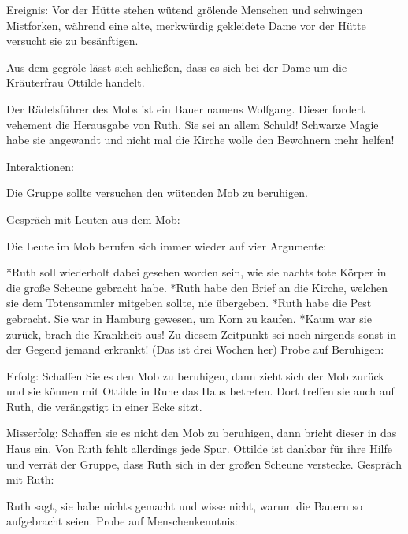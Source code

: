 Ereignis: Vor der Hütte stehen wütend grölende Menschen und schwingen Mistforken, während eine alte, merkwürdig gekleidete Dame vor der Hütte versucht sie zu besänftigen.

Aus dem gegröle lässt sich schließen, dass es sich bei der Dame um die Kräuterfrau Ottilde handelt.

Der Rädelsführer des Mobs ist ein Bauer namens Wolfgang. Dieser fordert vehement die Herausgabe von Ruth. Sie sei an allem Schuld! Schwarze Magie habe sie angewandt und nicht mal die Kirche wolle den Bewohnern mehr helfen!

Interaktionen:

Die Gruppe sollte versuchen den wütenden Mob zu beruhigen.

Gespräch mit Leuten aus dem Mob:

Die Leute im Mob berufen sich immer wieder auf vier Argumente:

*Ruth soll wiederholt dabei gesehen worden sein, wie sie nachts tote Körper in die große Scheune gebracht habe.
*Ruth habe den Brief an die Kirche, welchen sie dem Totensammler mitgeben sollte, nie übergeben.
*Ruth habe die Pest gebracht. Sie war in Hamburg gewesen, um Korn zu kaufen.
*Kaum war sie zurück, brach die Krankheit aus! Zu diesem Zeitpunkt sei noch nirgends sonst in der Gegend jemand erkrankt! (Das ist drei Wochen her)
Probe auf Beruhigen:

Erfolg: Schaffen Sie es den Mob zu beruhigen, dann zieht sich der Mob zurück und sie können mit Ottilde in Ruhe das Haus betreten.
Dort treffen sie auch auf Ruth, die verängstigt in
einer Ecke sitzt.

Misserfolg: Schaffen sie es nicht den Mob zu beruhigen, dann bricht dieser in das Haus ein.
Von Ruth fehlt allerdings jede Spur. Ottilde ist dankbar für ihre Hilfe und verrät der Gruppe,
dass Ruth sich in der großen Scheune verstecke.
Gespräch mit Ruth:

Ruth sagt, sie habe nichts gemacht und wisse nicht, warum die Bauern so aufgebracht seien.
Probe auf Menschenkenntnis:


